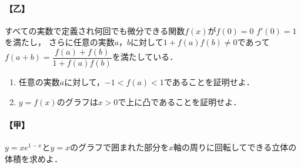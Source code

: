 \documentclass[../../main.tex]{subfiles}
\begin{document}
\paragraph{【乙】}
すべての実数で定義され何回でも微分できる関数$f(x)$が$f(0)=0$ $f'(0)=1$を満たし，
さらに任意の実数$a$，$b$に対して$1+f(a)f(b) \neq 0$であって$\displaystyle f(a+b)=\dfrac{f(a)+f(b)}{1+f(a)f(b)}$を満たしている．
\begin{enumerate}
  \item 任意の実数$a$に対して，$-1<f(a)<1$であることを証明せよ．
  \item $y=f(x)$のグラフは$x>0$で上に凸であることを証明せよ．
\end{enumerate}

\paragraph{【甲】}
$y=xe^{1-x}$と$y=x$のグラフで囲まれた部分を$x$軸の周りに回転してできる立体の体積を求めよ．
\end{document}
